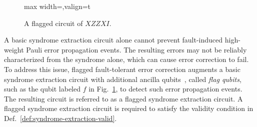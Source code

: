 \documentclass[acmsmall,screen,review,anonymous,nonacm]{acmart}
\begin{document}
\begin{figure}
\centering
\vspace{-4mm}
\begin{adjustbox}{max width=\textwidth,valign=t}
\scriptsize
{}
\end{adjustbox}
\caption{A flagged circuit of $XZZXI$.}
\label{fig:flagged-circuit}

\end{figure}


A basic syndrome extraction circuit alone cannot prevent fault-induced high-weight Pauli error propagation events. The resulting errors may not be reliably characterized from the syndrome alone, which can cause error correction to fail. To address this issue, flagged fault-tolerant error correction augments a basic syndrome extraction circuit with additional ancilla qubits~\cite{CR18a,CR18b}, called \emph{flag qubits}, such as the qubit labeled $f$ in Fig.~\ref{fig:flagged-circuit}, to detect such error propagation events.  The resulting circuit is referred to as a flagged syndrome extraction circuit. 
A flagged syndrome extraction circuit is required to satisfy the validity condition in Def.~\ref{def:syndrome-extraction-valid}. 
\end{document}
